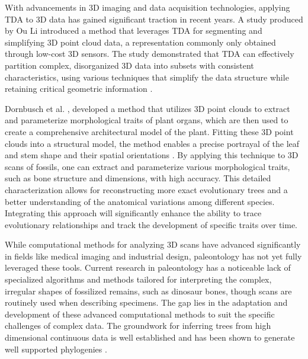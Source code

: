 \documentclass[12pt]{article}
\begin{document}

With advancements in 3D imaging and data acquisition technologies, applying TDA 
to 3D data has gained significant traction in recent years. A study produced by 
Ou Li \citep{li2021} introduced a method that leverages TDA for segmenting and 
simplifying 3D point cloud data, a representation commonly only obtained through 
low-cost 3D sensors. The study demonstrated that TDA can effectively partition 
complex, disorganized 3D data into subsets with consistent characteristics, 
using various techniques that simplify the data structure while retaining 
critical geometric information \citep{li2021}.

Dornbusch et al. \cite{dornbusch2007}, developed a method that utilizes 3D point 
clouds to extract and parameterize morphological traits of plant organs, which 
are then used to create a comprehensive architectural model of the plant. Fitting 
these 3D point clouds into a structural model, the method enables a precise 
portrayal of the leaf and stem shape and their spatial orientations \citep{dornbusch2007}. 
By applying this technique to 3D scans of fossils, one can extract and parameterize 
various morphological traits, such as bone structure and dimensions, with high 
accuracy. This detailed characterization allows for reconstructing more exact
evolutionary trees and a better understanding of the anatomical variations among
different species. Integrating this approach will significantly enhance the
ability to trace evolutionary relationships and track the development of
specific traits over time. 

While computational methods for analyzing 3D scans have advanced significantly
in fields like medical imaging and industrial design, paleontology has not yet
fully leveraged these tools. Current research in paleontology has a noticeable lack of
specialized algorithms and methods tailored for interpreting the complex,
irregular shapes of fossilized remains, such as dinosaur bones, though scans are
routinely used when describing specimens. The gap lies in
the adaptation and development of these advanced computational methods to suit
the specific challenges of complex data. The groundwork for inferring
trees from high dimensional continuous data is well established and has been
shown to generate well supported phylogenies \cite{gonzalez2008}.
\end{document}
